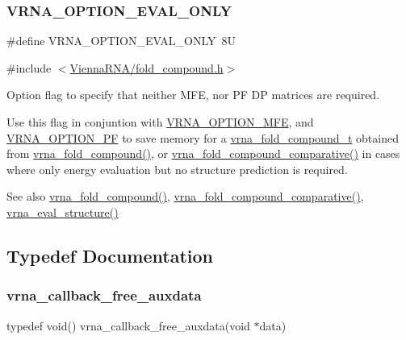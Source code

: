 \subsubsection{\texorpdfstring{VRNA\_OPTION\_EVAL\_ONLY}{VRNA\_OPTION\_EVAL\_ONLY}}
{\footnotesize\ttfamily \#define V\+R\+N\+A\+\_\+\+O\+P\+T\+I\+O\+N\+\_\+\+E\+V\+A\+L\+\_\+\+O\+N\+LY~8U}



{\ttfamily \#include $<$\mbox{\hyperlink{fold__compound_8h}{Vienna\+R\+N\+A/fold\+\_\+compound.\+h}}$>$}



Option flag to specify that neither M\+FE, nor PF DP matrices are required. 

Use this flag in conjuntion with \mbox{\hyperlink{group__fold__compound_gae63be9127fe7dcc1f9bb14f5bb1064ee}{V\+R\+N\+A\+\_\+\+O\+P\+T\+I\+O\+N\+\_\+\+M\+FE}}, and \mbox{\hyperlink{group__fold__compound_gabfbadcddda3e74ce7f49035ef8f058f7}{V\+R\+N\+A\+\_\+\+O\+P\+T\+I\+O\+N\+\_\+\+PF}} to save memory for a \mbox{\hyperlink{group__fold__compound_ga1b0cef17fd40466cef5968eaeeff6166}{vrna\+\_\+fold\+\_\+compound\+\_\+t}} obtained from \mbox{\hyperlink{group__fold__compound_ga6601d994ba32b11511b36f68b08403be}{vrna\+\_\+fold\+\_\+compound()}}, or \mbox{\hyperlink{group__fold__compound_gad6bacc816af274922b13d947f708aa0c}{vrna\+\_\+fold\+\_\+compound\+\_\+comparative()}} in cases where only energy evaluation but no structure prediction is required.

\begin{DoxySeeAlso}{See also}
\mbox{\hyperlink{group__fold__compound_ga6601d994ba32b11511b36f68b08403be}{vrna\+\_\+fold\+\_\+compound()}}, \mbox{\hyperlink{group__fold__compound_gad6bacc816af274922b13d947f708aa0c}{vrna\+\_\+fold\+\_\+compound\+\_\+comparative()}}, \mbox{\hyperlink{group__eval_ga58f199f1438d794a265f3b27fc8ea631}{vrna\+\_\+eval\+\_\+structure()}} 
\end{DoxySeeAlso}


\subsection{Typedef Documentation}
\mbox{\label{group__fold__compound_ga7806651f51b195013839a218b3bbd5a3}} 
\subsubsection{\texorpdfstring{vrna\_callback\_free\_auxdata}{vrna\_callback\_free\_auxdata}}
{\footnotesize\ttfamily typedef void() vrna\+\_\+callback\+\_\+free\+\_\+auxdata(void $\ast$data)}



